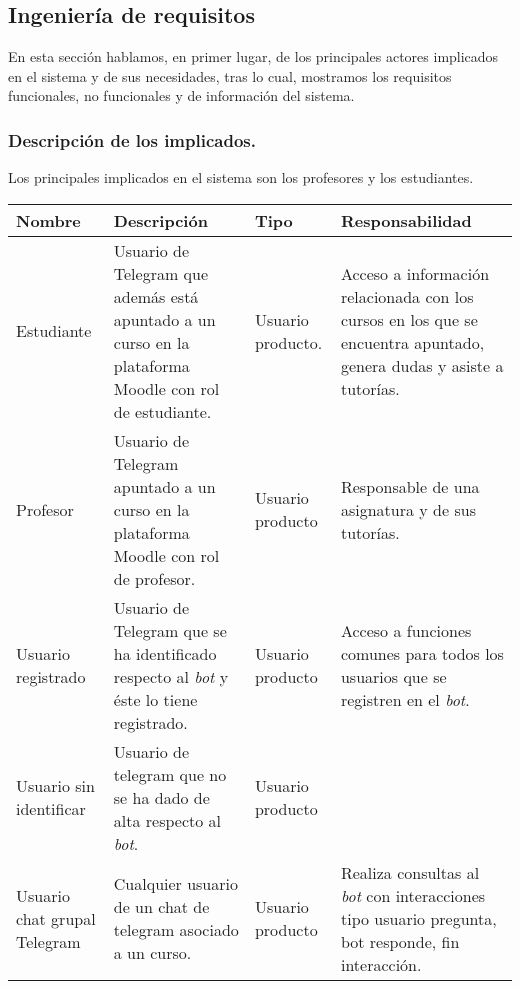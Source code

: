\chapter{}


\section{Ingeniería de requisitos}

En esta sección hablamos, en primer lugar, de los principales actores implicados en el sistema y de sus necesidades, tras lo cual, mostramos los requisitos funcionales, no funcionales y de información del sistema.

\subsection{Descripción de los implicados.}

Los principales implicados en el sistema son los profesores y los estudiantes.

\begin{tabular}{|p{3cm}|p{4cm}|p{2cm}|p{6cm}|}
\hline
{\bf Nombre } & {\bf Descripción } & {\bf Tipo } & {\bf  Responsabilidad}\\
\hline
{ Estudiante } & { Usuario de Telegram que además está apuntado a un curso en la plataforma Moodle con rol de estudiante.} & { Usuario producto. } & { Acceso a información relacionada con los cursos en los que se encuentra apuntado, genera dudas y  asiste a tutorías.} \\
\hline
{ Profesor } & {  Usuario de Telegram apuntado a un curso en la plataforma Moodle con rol de profesor.} & { Usuario producto } & { Responsable de una asignatura y de sus tutorías.} \\
\hline
{ Usuario registrado } & {  Usuario de Telegram que se ha identificado respecto al \textit{bot} y éste lo tiene registrado.} & { Usuario producto } & { Acceso a funciones comunes para todos los usuarios que se registren en el \textit{bot}. } \\
\hline
{ Usuario sin identificar } & {  Usuario de telegram que no se ha dado de alta respecto al \textit{bot}.} & { Usuario producto } & { } \\
\hline
{ Usuario chat grupal Telegram} & {  Cualquier usuario de un chat de telegram asociado a un curso.} & { Usuario producto } & { Realiza consultas al \textit{bot} con interacciones tipo usuario pregunta, bot responde, fin interacción.} \\
\hline

\end{tabular}



